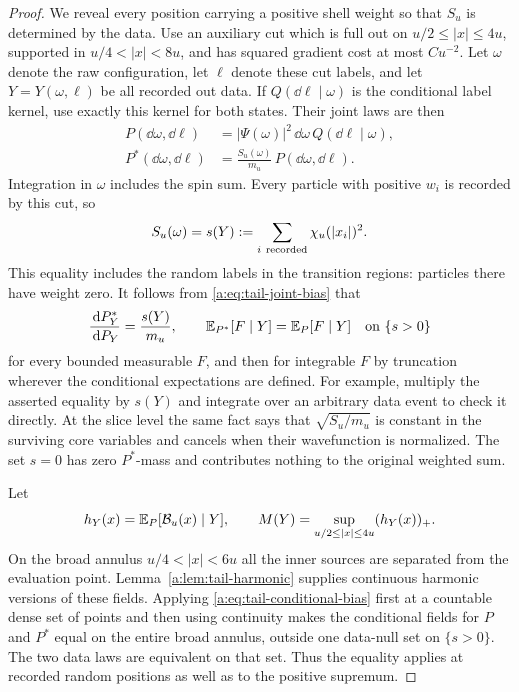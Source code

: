 \begin{proof}
We reveal every position carrying a positive shell weight so that
$S_u$ is determined by the data. Use an auxiliary cut which is full
out on $u/2\le|x|\le4u$, supported
in $u/4<|x|<8u$, and has squared gradient cost at most $Cu^{-2}$.
Let $\omega$ denote the raw configuration, let $\ell$ denote these
cut labels, and let $Y=Y(\omega,\ell)$ be all recorded out data.  If
$Q(\dd\ell\mid\omega)$ is the conditional label kernel, use exactly
this kernel for both states.  Their joint laws are then
\begin{equation}\label{a:eq:tail-joint-bias}
 \begin{split}
 P(\dd\omega,\dd\ell)
  &=|\Psi(\omega)|^2\,\dd\omega\,Q(\dd\ell\mid\omega),\\
 P^*(\dd\omega,\dd\ell)
  &=\frac{S_u(\omega)}{m_u}\,P(\dd\omega,\dd\ell).
 \end{split}
\end{equation}
Integration in $\omega$ includes the spin sum.  Every particle with
positive $w_i$ is recorded by this cut, so
\[
 S_u(\omega)=s(Y):=
 \sum_{i\ {\rm recorded}}\chi_u(|x_i|)^2.
\]
This equality includes the random labels in the transition regions:
particles there have weight zero.  It follows from
\eqref{a:eq:tail-joint-bias} that
\begin{equation}\label{a:eq:tail-conditional-bias}
 \frac{\,\mathrm d P_Y^*}{\,\mathrm d P_Y}=\frac{s(Y)}{m_u},\qquad
 \mathbb E_{P^*}[F\mid Y]=\mathbb E_P[F\mid Y]\quad\text{on }\{s>0\}
\end{equation}
for every bounded measurable $F$, and then for integrable $F$ by
truncation wherever the conditional expectations are defined.  For
example, multiply the asserted equality by $s(Y)$ and integrate over
an arbitrary data event to check it directly.  At the slice level the
same fact says that $\sqrt{S_u/m_u}$ is constant in the surviving core
variables and cancels when their wavefunction is normalized.  The set
$s=0$ has zero $P^*$-mass and contributes nothing to the original
weighted sum.

Let
\[
 h_Y(x)=\mathbb E_P[\mathcal B_u(x)\mid Y],\qquad
 M(Y)=\sup_{u/2\le|x|\le4u}(h_Y(x))_+.
\]
On the broad annulus $u/4<|x|<6u$ all the inner sources are separated
from the evaluation point.  Lemma~\ref{a:lem:tail-harmonic} supplies
continuous harmonic versions of these fields.  Applying
\eqref{a:eq:tail-conditional-bias} first at a countable dense set of
points and then using continuity makes the conditional fields for
$P$ and $P^*$ equal on the entire broad annulus, outside one data-null
set on $\{s>0\}$.  The two data laws are equivalent on that set.
Thus the equality applies at recorded random positions as well as to
the positive supremum.


\end{proof}
